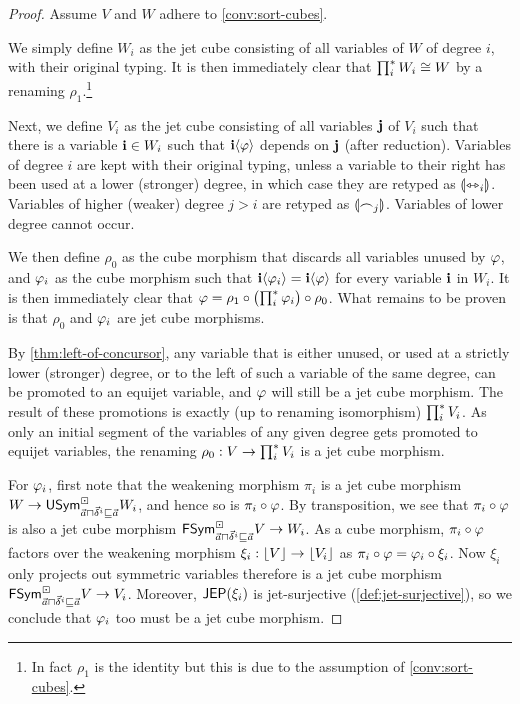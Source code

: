 \documentclass[a4paper]{memoir}
\begin{document}
\begin{proof}
	Assume $V$ and $W$ adhere to \cref{conv:sort-cubes}.

	We simply define $W_i$ as the jet cube consisting of all variables of $W$ of degree $i$, with their original typing.
	It is then immediately clear that $\prod^{*}_i W_i \cong W$ by a renaming $\rho_1$.\footnote{In fact $\rho_1$ is the identity but this is due to the assumption of \cref{conv:sort-cubes}.}
	
	Next, we define $V_i$ as the jet cube consisting of all variables $\mathbf{j}$ of $V_i$ such that there is a variable $\mathbf{i} \in W_i$ such that $\mathbf{i} \langle \varphi \rangle$ depends on $\mathbf{j}$ (after reduction).
	Variables of degree $i$ are kept with their original typing, unless a variable to their right has been used at a lower (stronger) degree, in which case they are retyped as ${\llparenthesis \leftrightarrowtriangle_i \rrparenthesis}$. Variables of higher (weaker) degree $j>i$ are retyped as ${\llparenthesis \frown_j \rrparenthesis}$. Variables of lower degree cannot occur.
	
	We then define $\rho_0$ as the cube morphism that discards all variables unused by $\varphi$, and $\varphi_i$ as the cube morphism such that $\mathbf{i} \langle \varphi_i \rangle = \mathbf{i} \langle \varphi \rangle$ for every variable $\mathbf{i}$ in $W_i$.
	It is then immediately clear that $\varphi = \rho_1 \circ \mathopen{}\left( \prod^{*}_i \varphi_i \right)\mathclose{} \circ \rho_0$.
	What remains to be proven is that $\rho_0$ and $\varphi_i$ are jet cube morphisms.
	
	By \cref{thm:left-of-concursor}, any variable that is either unused, or used at a strictly lower (stronger) degree, or to the left of such a variable of the same degree, can be promoted to an equijet variable, and $\varphi$ will still be a jet cube morphism.
	The result of these promotions is exactly (up to renaming isomorphism) $\prod^{*}_i V_i$.
	As only an initial segment of the variables of any given degree gets promoted to equijet variables, the renaming $\rho_0 : V \to \prod^{*}_i V_i$ is a jet cube morphism.
	
	For $\varphi_i$, first note that the weakening morphism $\pi_i$ is a jet cube morphism $W \to \mathsf{USym}^\boxdot_{\vec a \sqcap \vec \delta^i \sqsubseteq \vec a} W_i$, and hence so is $\pi_i \circ \varphi$.
	By transposition, we see that $\pi_i \circ \varphi$ is also a jet cube morphism $\mathsf{FSym}^\boxdot_{\vec a \sqcap \vec \delta^i \sqsubseteq \vec a} V \to W_i$.
	As a cube morphism, $\pi_i \circ \varphi$ factors over the weakening morphism $\xi_i : \mathopen{}\left\lfloor V \right\rfloor\mathclose{} \to \mathopen{}\left\lfloor V_i \right\rfloor\mathclose{}$ as $\pi_i \circ \varphi = \varphi_i \circ \xi_i$.
	Now $\xi_i$ only projects out symmetric variables therefore is a jet cube morphism $\mathsf{FSym}^\boxdot_{\vec a \sqcap \vec \delta^i \sqsubseteq \vec a} V \to V_i$. Moreover, $\mathsf{JEP}(\xi_i)$ is jet-surjective (\cref{def:jet-surjective}), so we conclude that $\varphi_i$ too must be a jet cube morphism.
\end{proof}
\end{document}
